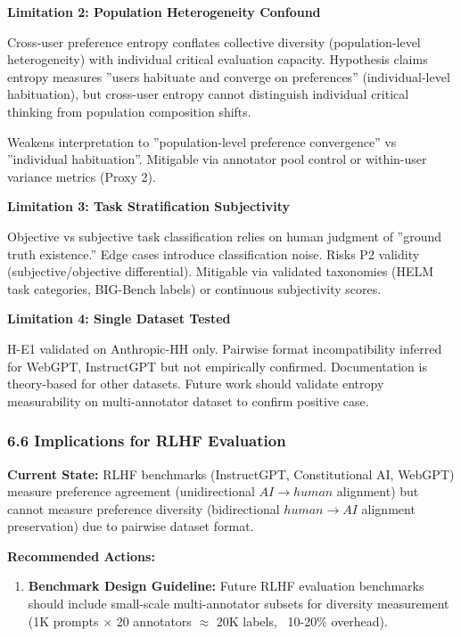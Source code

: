 \textbf{Limitation 2: Population Heterogeneity Confound}

Cross-user preference entropy conflates collective diversity (population-level heterogeneity) with individual critical evaluation capacity. Hypothesis claims entropy measures ''users habituate and converge on preferences'' (individual-level habituation), but cross-user entropy cannot distinguish individual critical thinking from population composition shifts.

Weakens interpretation to ''population-level preference convergence'' vs ''individual habituation''. Mitigable via annotator pool control or within-user variance metrics (Proxy 2).

\textbf{Limitation 3: Task Stratification Subjectivity}

Objective vs subjective task classification relies on human judgment of ''ground truth existence.'' Edge cases introduce classification noise. Risks P2 validity (subjective/objective differential). Mitigable via validated taxonomies (HELM task categories, BIG-Bench labels) or continuous subjectivity scores.

\textbf{Limitation 4: Single Dataset Tested}

H-E1 validated on Anthropic-HH only. Pairwise format incompatibility inferred for WebGPT, InstructGPT but not empirically confirmed. Documentation is theory-based for other datasets. Future work should validate entropy measurability on multi-annotator dataset to confirm positive case.

\subsubsection{6.6 Implications for RLHF Evaluation}

\textbf{Current State:} RLHF benchmarks (InstructGPT, Constitutional AI, WebGPT) measure preference agreement (unidirectional $AI\rightarrow human$ alignment) but cannot measure preference diversity (bidirectional $human\rightarrow AI$ alignment preservation) due to pairwise dataset format.

\textbf{Recommended Actions:}

\begin{enumerate}
\item \textbf{Benchmark Design Guideline:} Future RLHF evaluation benchmarks should include small-scale multi-annotator subsets for diversity measurement (1K prompts $\times$ 20 annotators $\approx$ 20K labels, ~10-20\% overhead).
\end{enumerate}


